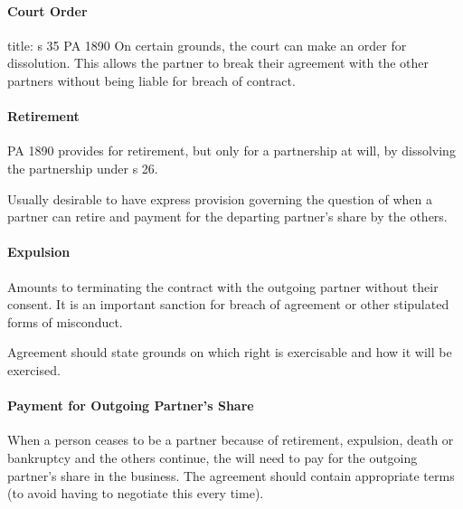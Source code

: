 \documentclass[
]{article}
\newenvironment{Shaded}{}{}
\newcommand{\NormalTok}[1]{#1}
\begin{document}
\hypertarget{court-order}{%
\paragraph{Court Order}\label{court-order}}

\begin{Shaded}
\begin{Highlighting}[]
\NormalTok{title: s 35 PA 1890}
\NormalTok{On certain grounds, the court can make an order for dissolution. This allows the partner to break their agreement with the other partners without being liable for breach of contract.}
\end{Highlighting}
\end{Shaded}

\hypertarget{retirement}{%
\paragraph{Retirement}\label{retirement}}

PA 1890 provides for retirement, but only for a partnership at will, by
dissolving the partnership under s 26.

Usually desirable to have express provision governing the question of
when a partner can retire and payment for the departing partner's share
by the others.

\hypertarget{expulsion}{%
\paragraph{Expulsion}\label{expulsion}}

Amounts to terminating the contract with the outgoing partner without
their consent. It is an important sanction for breach of agreement or
other stipulated forms of misconduct.

Agreement should state grounds on which right is exercisable and how it
will be exercised.

\hypertarget{payment-for-outgoing-partners-share}{%
\paragraph{Payment for Outgoing Partner's
Share}\label{payment-for-outgoing-partners-share}}

When a person ceases to be a partner because of retirement, expulsion,
death or bankruptcy and the others continue, the will need to pay for
the outgoing partner's share in the business. The agreement should
contain appropriate terms (to avoid having to negotiate this every
time).
\end{document}
